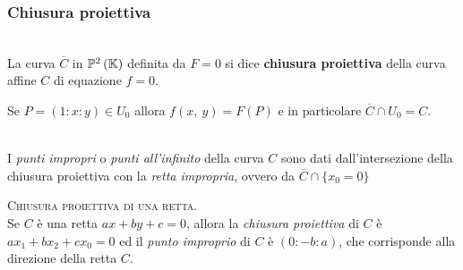 \subsubsection{Chiusura proiettiva}
\begin{define}~{}\\
	La curva $\overline{C}$ in $\proj[2]{\kamp}$ definita da $F=0$ si dice \textbf{chiusura proiettiva} della curva affine $C$ di equazione $f=0$.
\end{define}
Se $P=(1\colon x\colon y)\in U_0$  allora $f\left(x,\ y\right)=F\left(P\right)$ e in particolare $\overline{C}\cap U_0=C$.
\begin{define}~{}\\
	I \textit{punti impropri} o \textit{punti all'infinito} della curva $C$ sono dati dall'intersezione della chiusura proiettiva con la \textit{retta impropria}, ovvero da $\overline{C}\cap\{x_0=0\}$
\end{define}
\begin{example}\textsc{Chiusura proiettiva di una retta}.\\
	Se $C$ è una retta $ax+by+c=0$, allora la \textit{chiusura proiettiva} di $C$ è $ax_1+bx_2+cx_0=0$ ed il \textit{punto improprio} di $C$ è $(0\colon -b\colon a)$, che corrisponde alla direzione della retta $C$.
\end{example}

